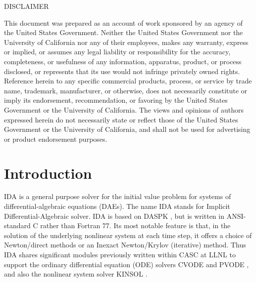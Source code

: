 \newpage

\thispagestyle{empty}

%
\vspace*{1.0in}
\scriptsize
\begin{center}
\begin{minipage}{4.0in}
\begin{center}
DISCLAIMER
\end{center}
This document was prepared as an account of work sponsored by an
agency of the United States Government.
Neither the United States Government nor the University of California
nor any of their employees, makes any warranty, express or implied, or
assumes any legal liability or responsibility for the accuracy,
completeness, or usefulness of any information, apparatus, product, or
process disclosed, or represents that its use would not infringe
privately owned rights.
Reference herein to any specific commercial products, process, or
service by trade name, trademark, manufacturer, or otherwise, does not
necessarily constitute or imply its endorsement, recommendation, or
favoring by the United States Government or the University of
California.
The views and opinions of authors expressed herein do not necessarily
state or reflect those of the United States Government or the
University of California, and shall not be used for advertising or
product endorsement purposes.  
\par\vspace*{1.0in}

\end{minipage}
\end{center}

\normalsize



\maketitle

\setcounter{page}{1}

\section{Introduction}

IDA is a general purpose solver for the initial value problem for
systems of differential-algebraic equations (DAEs).  The name IDA
stands for Implicit Differential-Algebraic solver.  IDA is based on
DASPK \cite{BrHiPe94,BrHiPe98}, but is written in ANSI-standard C
rather than Fortran 77.  Its most notable feature is that, in the
solution of the underlying nonlinear system at each time step, it
offers a choice of Newton/direct methods or an Inexact Newton/Krylov
(iterative) method.  Thus IDA shares significant modules previously
written within CASC at LLNL to support the ordinary differential
equation (ODE) solvers CVODE \cite{CoHi94,CoHi96} and PVODE
\cite{ByHi98,ByHi99}, and also the nonlinear system solver KINSOL
\cite{TaHi98}.

